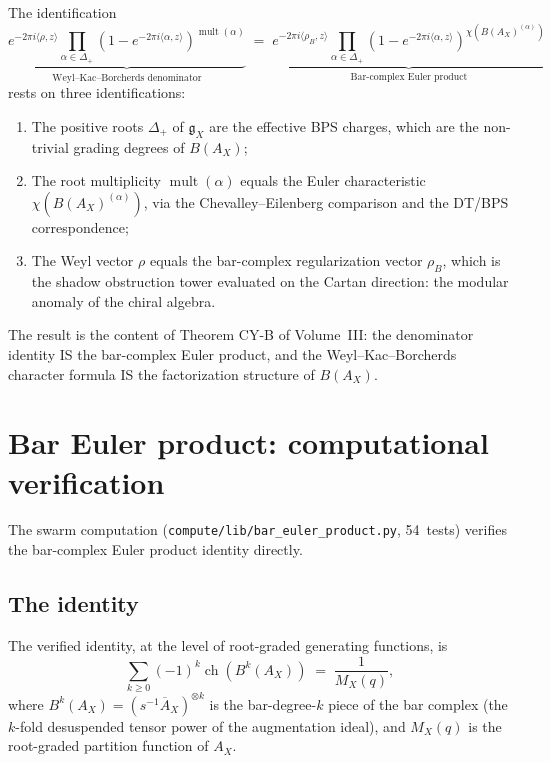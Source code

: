 \documentclass[11pt]{article}
\theoremstyle{definition}
\theoremstyle{remark}
\DeclareMathOperator{\mult}{mult}
\DeclareMathOperator{\ch}{ch}
\newcommand{\frakg}{\mathfrak{g}}
\begin{document}
The identification
\[
 \underbrace{e^{-2\pi i\langle\rho,z\rangle}
 \prod_{\alpha \in \Delta_+}(1-e^{-2\pi i\langle\alpha,z\rangle})^{\mult(\alpha)}}_{\text{Weyl--Kac--Borcherds denominator}}
 \;=\;
 \underbrace{e^{-2\pi i\langle\rho_B,z\rangle}
 \prod_{\alpha \in \Delta_+}(1-e^{-2\pi i\langle\alpha,z\rangle})^{\chi(B(A_X)^{(\alpha)})}}_{\text{Bar-complex Euler product}}
\]
rests on three identifications:
\begin{enumerate}
\item The positive roots $\Delta_+$ of $\frakg_X$ are the effective
 BPS charges, which are the non-trivial grading degrees of $B(A_X)$;
\item The root multiplicity $\mult(\alpha)$ equals the Euler characteristic
 $\chi(B(A_X)^{(\alpha)})$, via the Chevalley--Eilenberg comparison and
 the DT/BPS correspondence;
\item The Weyl vector $\rho$ equals the bar-complex regularization vector
 $\rho_B$, which is the shadow obstruction tower evaluated on the Cartan direction:
 the modular anomaly of the chiral algebra.
\end{enumerate}
The result is the content of Theorem CY-B of Volume~III: the denominator
identity IS the bar-complex Euler product, and the Weyl--Kac--Borcherds
character formula IS the factorization structure of $B(A_X)$.

\section{Bar Euler product: computational verification}
\label{sec:bar-euler-verification}

The swarm computation (\texttt{compute/lib/bar\_euler\_product.py},
54~tests) verifies the bar-complex Euler product identity directly.

\subsection{The identity}

The verified identity, at the level of root-graded generating functions, is
\[
 \sum_{k \geq 0} (-1)^k \ch(B^k(A_X))
 \;=\; \frac{1}{M_X(q)},
\]
where $B^k(A_X) = (s^{-1} \overline{A}_X)^{\otimes k}$ is the
bar-degree-$k$ piece of the bar complex (the $k$-fold desuspended
tensor power of the augmentation ideal), and $M_X(q)$ is the
root-graded partition function of $A_X$.
\end{document}
